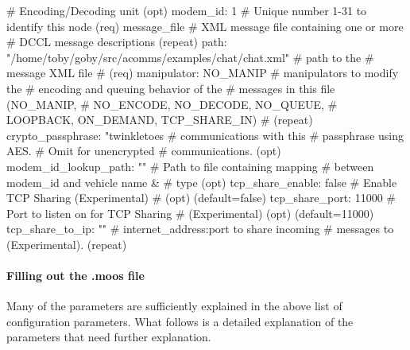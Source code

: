 \documentclass[11pt, letterpaper, oneside]{memoir}
\begin{document}
\begin{boxedverbatim}
{{              # Encoding/Decoding unit (opt)
    modem_id: 1  # Unique number 1-31 to identify this node (req)
    message_file {  # XML message file containing one or more 
                    # DCCL message descriptions (repeat)
      path: "/home/toby/goby/src/acomms/examples/chat/chat.xml"  
                                              # path to the 
                                              # message XML file 
                                              # (req)
      manipulator: NO_MANIP  # manipulators to modify the 
                             # encoding and queuing behavior of the 
                             # messages in this file (NO_MANIP, 
                             # NO_ENCODE, NO_DECODE, NO_QUEUE, 
                             # LOOPBACK, ON_DEMAND, TCP_SHARE_IN) 
                             # (repeat)
    }
    crypto_passphrase: "twinkletoes%
                                         # communications with this 
                                         # passphrase using AES. 
                                         # Omit for unencrypted 
                                         # communications. (opt)
  }
  modem_id_lookup_path: ""  # Path to file containing mapping 
                            # between modem_id and vehicle name & 
                            # type (opt)
  tcp_share_enable: false  # Enable TCP Sharing (Experimental) 
                           # (opt) (default=false)
  tcp_share_port: 11000  # Port to listen on for TCP Sharing 
                         # (Experimental) (opt) (default=11000)
  tcp_share_to_ip: ""  # internet_address:port to share incoming 
                       # messages to (Experimental). (repeat)
}

\end{boxedverbatim}%
\resetbvlinenumber

\paragraph{Filling out the .moos file}

Many of the parameters are sufficiently explained in the above list of configuration parameters. What follows is a detailed explanation of the parameters that need further explanation.
\end{document}
